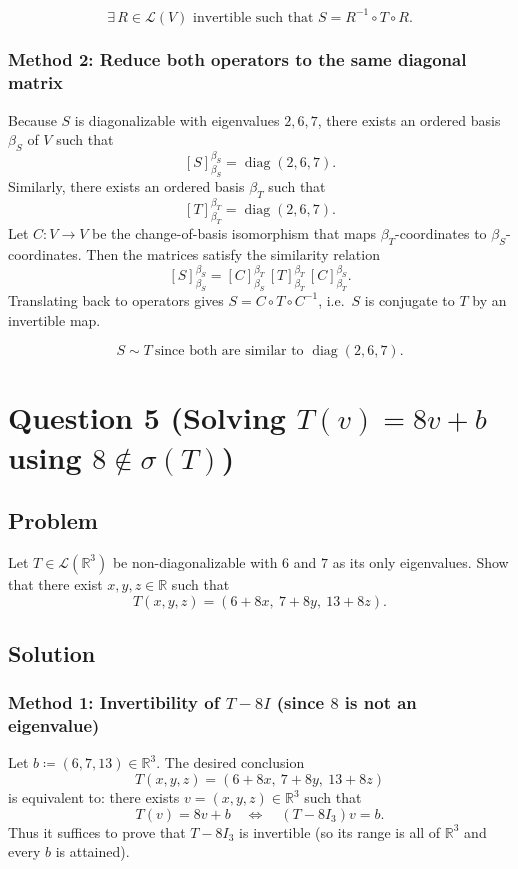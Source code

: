 \documentclass[12pt]{article}
\newcommand{\R}{\mathbb{R}}
\newcommand{\cL}{\mathcal{L}}
\DeclareMathOperator{\diag}{diag}
\begin{document}
\[
\boxed{\,\exists\,R\in\cL(V)\text{ invertible such that }S=R^{-1}\circ T\circ R.\,}
\]

\subsubsection{Method 2: Reduce both operators to the same diagonal matrix}
Because $S$ is diagonalizable with eigenvalues $2,6,7$, there exists an ordered basis $\beta_S$ of $V$ such that
\[
[S]_{\beta_S}^{\beta_S}=\diag(2,6,7).
\]
Similarly, there exists an ordered basis $\beta_T$ such that
\[
[T]_{\beta_T}^{\beta_T}=\diag(2,6,7).
\]
Let $C:V\to V$ be the change-of-basis isomorphism that maps $\beta_T$-coordinates to $\beta_S$-coordinates.
Then the matrices satisfy the similarity relation
\[
[S]_{\beta_S}^{\beta_S}= [C]_{\beta_S}^{\beta_T}\,[T]_{\beta_T}^{\beta_T}\,[C]_{\beta_T}^{\beta_S}.
\]
Translating back to operators gives $S=C\circ T\circ C^{-1}$, i.e.\ $S$ is conjugate to $T$ by an invertible map.

\[
\boxed{\,S\sim T\ \text{since both are similar to }\diag(2,6,7).\,}
\]

\newpage
\section{Question 5 (Solving $T(v)=8v+b$ using $8\notin \sigma(T)$)}
\subsection{Problem}
Let $T\in\cL(\R^3)$ be non-diagonalizable with $6$ and $7$ as its only eigenvalues.
Show that there exist $x,y,z\in\R$ such that
\[
T(x,y,z)=(6+8x,\ 7+8y,\ 13+8z).
\]

\subsection{Solution}

\subsubsection{Method 1: Invertibility of $T-8I$ (since $8$ is not an eigenvalue)}
Let $b\coloneqq (6,7,13)\in\R^3$. The desired conclusion
\[
T(x,y,z)=(6+8x,\ 7+8y,\ 13+8z)
\]
is equivalent to: there exists $v=(x,y,z)\in\R^3$ such that
\[
T(v)=8v+b
\quad\Longleftrightarrow\quad
(T-8I_3)v=b.
\]
Thus it suffices to prove that $T-8I_3$ is invertible (so its range is all of $\R^3$ and every $b$ is attained).
\end{document}
